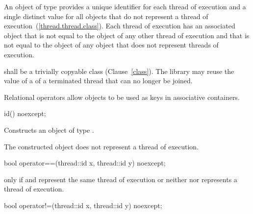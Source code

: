 \pnum An object of type  provides a unique identifier for
each thread of execution and a single distinct value for all 
objects that do not represent a thread of
execution~(\ref{thread.thread.class}). Each thread of execution has an
associated  object that is not equal to the
 object of any other thread of execution and that is not
equal to the  object of any  object that
does not represent threads of execution.

\pnum
{} shall be a trivially copyable class (Clause~\ref{class}).
The library may reuse the value of a  of a terminated thread that can no longer be joined.

\pnum
\begin{note} Relational operators allow  objects to be used as
keys in associative containers. \end{note}

%
\begin{itemdecl}
id() noexcept;
\end{itemdecl}

\begin{itemdescr}
\pnum\effects Constructs an object of type .

\pnum\postconditions The constructed object does not represent a thread of execution.
\end{itemdescr}

%
%
\begin{itemdecl}
bool operator==(thread::id x, thread::id y) noexcept;
\end{itemdecl}

\begin{itemdescr}
\pnum\returns {} only if  and  represent the same
thread of execution or neither  nor  represents a thread of
execution.
\end{itemdescr}

%
%
\begin{itemdecl}
bool operator!=(thread::id x, thread::id y) noexcept;
\end{itemdecl}

\begin{itemdescr}
\pnum\returns {}
\end{itemdescr}

